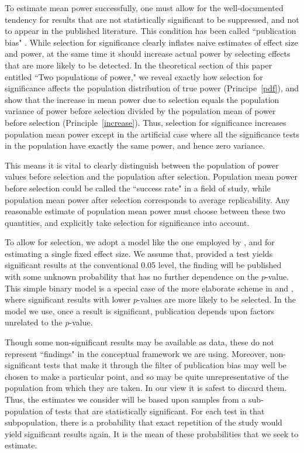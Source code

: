 \documentclass[jou]{apa6} %
\begin{document}
To estimate mean power successfully, one must allow for the well-documented tendency for results that are not statistically significant to be suppressed, and not to appear in the published literature. This condition has been called ``publication bias" \parencite{Sterling1959, Hedges1992, SterlingEtAl1995}. While selection for significance clearly inflates naive estimates of effect size \parencite{SimonsohnEtAl2014b, vanAssenEtAl2014} and power, at the same time it should increase actual power by selecting effects that are more likely to be detected. In the theoretical section of this paper entitled ``Two populations of power," we reveal exactly how selection for significance affects the population distribution of true power (Principe~\ref{pdf}), and show that the increase in mean power due to selection equals the population variance of power before selection divided by the population mean of power before selection (Principle~\ref{increase}). Thus, selection for significance increases population mean power except in the artificial case where all the significance tests in the population have exactly the same power, and hence zero variance.

This means it is vital to clearly distinguish between the population of power values before selection and the population after selection. Population mean power before selection could be called the ``success rate" in a field of study, while population mean power after selection corresponds to average replicability. Any reasonable estimate of population mean power must choose between these two quantities, and explicitly take selection for significance into account. 

To allow for selection, we adopt a model like the one employed by \textcite{Hedges1984}, \textcite{SimonsohnEtAl2014b} and \textcite{vanAssenEtAl2014}
for estimating a single fixed effect size. We assume that, provided a test yields significant results at the conventional 0.05 level, the finding will be published with some unknown probability that has no further dependence on the $p$-value. This simple binary model is a special case of the more elaborate scheme in \textcite{Hedges1992} and \textcite{HedgesVevea1996}, where significant results with lower $p$-values are more likely to be selected. In the model we use, once a result is significant, publication depends upon factors unrelated to the $p$-value.

Though some non-significant results may be available as data, these do not represent ``findings" in the conceptual framework we are using. Moreover, non-significant tests that make it through the filter of publication bias may well be chosen to make a particular point, and so may be quite unrepresentative of the population from which they are taken. In our view it is safest to discard them. Thus, the estimates we consider will be based upon samples from a sub-population of tests that are statistically significant. For each test in that subpopulation, there is a probability that exact repetition of the study would yield significant results again. It is the mean of these probabilities that we seek to estimate. 
\end{document}
